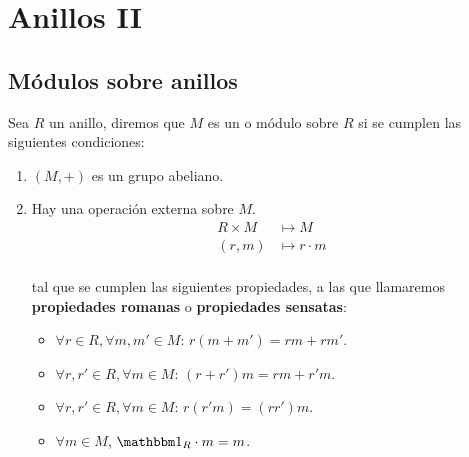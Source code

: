 \chapter{Anillos II}

\section{Módulos sobre anillos}
Sea $R$ un anillo, diremos que $M$ es un  o módulo sobre $R$ si se cumplen las siguientes condiciones:
\begin{enumerate}
	\item $(M,+)$ es un grupo abeliano.
	\item Hay una operación externa sobre $M$.
		\begin{align*}
			R×M & \longmapsto  M \\
			(r,m) & \longmapsto  r\cdot m \\
		\end{align*}

	tal que se cumplen las siguientes propiedades, a las que llamaremos \textbf{propiedades romanas} o \textbf{propiedades sensatas}:
	\begin{itemize}
		\item $\forall r \in R, \forall m,m' \in M$: $r(m+m')=rm+rm'$.
		\item $\forall r,r' \in R, \forall m \in M$: $(r+r')m=rm+r'm$.
		\item $\forall r,r' \in R, \forall m \in M$: $r(r'm)=(rr')m$.
		\item $\forall m \in M$, $\one_R\cdot m = m$.
	\end{itemize}
\end{enumerate}

